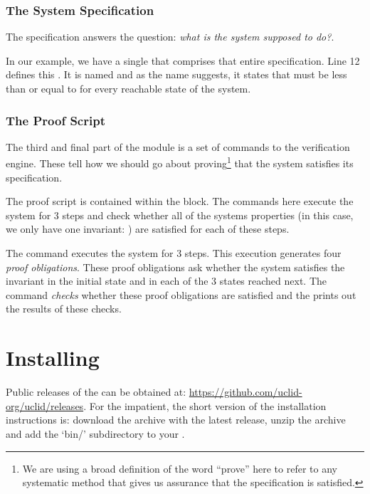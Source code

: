 \subsubsection{The System Specification}
The specification answers the question: \emph{what is the system supposed to do?}. 

In our example, we have a single  that comprises that entire specification. Line 12 defines this . It is named  and as the name suggests, it states that  must be less than or equal to  for every reachable state of the system.

\subsubsection{The Proof Script}
The third and final part of the \uclid{} module is a set of commands to the \uclid{} verification engine. These tell how we should go about proving\footnote{We are using a broad definition of the word ``prove'' here to refer to any systematic method that gives us assurance that the specification is satisfied.} that the system satisfies its specification.

The proof script is contained within the  block. The commands here execute the system for 3 steps and check whether all of the systems properties (in this case, we only have one invariant: ) are satisfied for each of these steps. 

The command  executes the system for 3 steps. This execution generates four \emph{proof obligations}. These proof obligations ask whether the system satisfies the invariant  in the initial state and in each of the 3 states reached next. The  command \emph{checks} whether these proof obligations are satisfied and the  prints out the results of these checks.

\section{Installing \uclid{}}

Public releases of the \uclid{} can be obtained at: \url{https://github.com/uclid-org/uclid/releases}. For the impatient, the short version of the installation instructions is: download the archive with the latest release, unzip the archive and add the `bin/' subdirectory to your . 


